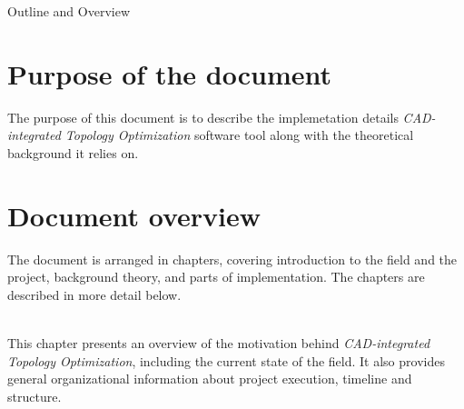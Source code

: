 \clearemptydoublepage

{}

\begin{center}
	\huge{Outline and Overview}
\end{center}




\section*{Purpose of the document}
The purpose of this document is to describe the implemetation details \emph{CAD-integrated Topology Optimization} software tool along with the theoretical background it relies on.
%

\section*{Document overview}
The document is arranged in chapters, covering introduction to the field and the project, background theory, and parts of implementation. The chapters are described in more detail below.
\\
\\
  \vspace{1mm}

\noindent  This chapter presents an overview of the motivation behind \emph{CAD-integrated Topology Optimization}, including the current state of the field. It also provides general organizational information about project execution, timeline and structure.
 \\


  \vspace{1mm}

